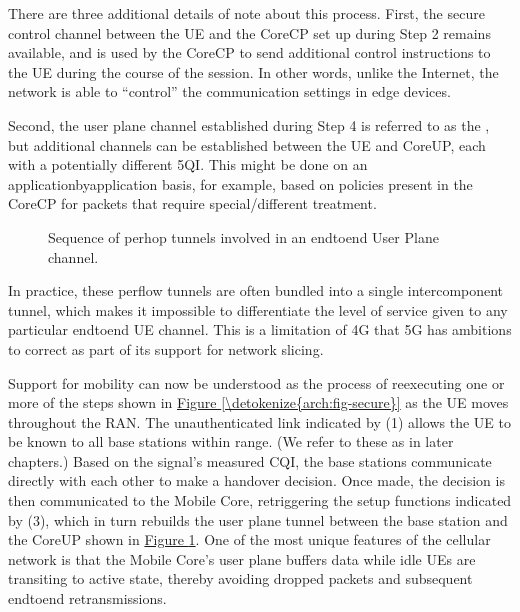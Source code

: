 \documentclass[a4paper,11pt,english]{sphinxmanual}
\let\sphinxpxdimen\pdfpxdimen\else\newdimen\sphinxpxdimen
\begin{document}
\sphinxAtStartPar
There are three additional details of note about this process. First,
the secure control channel between the UE and the Core\sphinxhyphen{}CP set up
during Step 2 remains available, and is used by the Core\sphinxhyphen{}CP to send
additional control instructions to the UE during the course of the
session. In other words, unlike the Internet, the network is able to
“control” the communication settings in edge devices.

\sphinxAtStartPar
Second, the user plane channel established during Step 4 is referred
to as the , but additional channels can be
established between the UE and Core\sphinxhyphen{}UP, each with a potentially
different 5QI. This might be done on an application\sphinxhyphen{}by\sphinxhyphen{}application
basis, for example, based on policies present in the Core\sphinxhyphen{}CP for
packets that require special/different treatment.

\begin{figure}[ht]
\centering
\capstart

\noindent\sphinxincludegraphics[width=500\sphinxpxdimen]{{Slide13}.png}
\caption{Sequence of per\sphinxhyphen{}hop tunnels involved in an end\sphinxhyphen{}to\sphinxhyphen{}end User Plane
channel.}\label{\detokenize{arch:id14}}\label{\detokenize{arch:fig-per-hop}}\end{figure}

\sphinxAtStartPar
In practice, these per\sphinxhyphen{}flow tunnels are often bundled into a single
inter\sphinxhyphen{}component tunnel, which makes it impossible to differentiate the
level of service given to any particular end\sphinxhyphen{}to\sphinxhyphen{}end UE channel. This
is a limitation of 4G that 5G has ambitions to correct as part of its
support for network slicing.

\sphinxAtStartPar
Support for mobility can now be understood as the process of
re\sphinxhyphen{}executing one or more of the steps shown in \hyperref[\detokenize{arch:fig-secure}]{Figure \ref{\detokenize{arch:fig-secure}}} as the UE moves throughout the RAN. The unauthenticated
link indicated by (1) allows the UE to be known to all base stations
within range. (We refer to these as  in later
chapters.) Based on the signal’s measured CQI, the base stations
communicate directly with each other to make a handover decision.
Once made, the decision is then communicated to the Mobile Core,
re\sphinxhyphen{}triggering the setup functions indicated by (3), which in turn
re\sphinxhyphen{}builds the user plane tunnel between the base station and the
Core\sphinxhyphen{}UP shown in \hyperref[\detokenize{arch:fig-per-hop}]{Figure \ref{\detokenize{arch:fig-per-hop}}}. One of the most
unique features of the cellular network is that the Mobile Core’s user
plane buffers data while idle UEs are transiting to active state,
thereby avoiding dropped packets and subsequent end\sphinxhyphen{}to\sphinxhyphen{}end
retransmissions.
\end{document}
